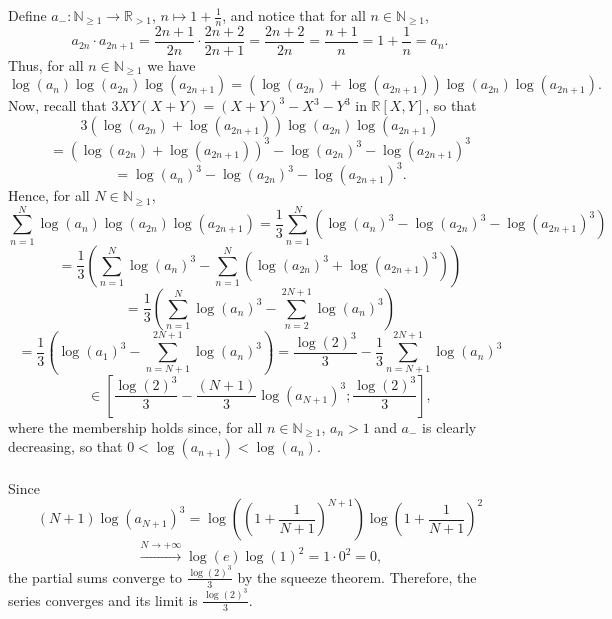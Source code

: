 \begin{solution}
    Define \( a_{-} \colon \mathbb{N}_{\geq 1} \to \mathbb{R}_{>1} \), \( n \mapsto 1+\frac{1}{n} \), and notice that for all \( n \in \mathbb{N}_{\geq 1} \),
    \[
        a_{2n} \cdot a_{2n+1} = \frac{2n+1}{2n} \cdot \frac{2n+2}{2n+1} = \frac{2n+2}{2n} = \frac{n+1}{n} = 1+\frac{1}{n} = a_n.
    \]
    Thus, for all \( n \in \mathbb{N}_{\geq 1} \) we have
    \[
        \log\left(a_n\right)\log\left(a_{2n}\right)\log\left(a_{2n+1}\right) = \left(\log\left(a_{2n}\right)+\log\left(a_{2n+1}\right)\right)\log\left(a_{2n}\right)\log\left(a_{2n+1}\right).
    \]
    Now, recall that \( 3XY\left(X+Y\right) = \left(X+Y\right)^3-X^3-Y^3 \) in \( \mathbb{R}\left[X,Y\right] \), so that
    \[
        3\left(\log\left(a_{2n}\right)+\log\left(a_{2n+1}\right)\right)\log\left(a_{2n}\right)\log\left(a_{2n+1}\right)
    \]
    \[
        = \left(\log\left(a_{2n}\right)+\log\left(a_{2n+1}\right)\right)^3-\log\left(a_{2n}\right)^3-\log\left(a_{2n+1}\right)^3
    \]
    \[
        = \log\left(a_n\right)^3-\log\left(a_{2n}\right)^3-\log\left(a_{2n+1}\right)^3.
    \]
    Hence, for all \( N \in \mathbb{N}_{\geq 1} \),
    \[
        \sum_{n=1}^{N} \log\left(a_n\right)\log\left(a_{2n}\right)\log\left(a_{2n+1}\right) = \frac{1}{3}\sum_{n=1}^{N} \left(\log\left(a_n\right)^3-\log\left(a_{2n}\right)^3-\log\left(a_{2n+1}\right)^3\right)
    \]
    \[
        = \frac{1}{3}\left(\sum_{n=1}^{N} \log\left(a_n\right)^3-\sum_{n=1}^{N} \left(\log\left(a_{2n}\right)^3+\log\left(a_{2n+1}\right)^3\right)\right)
    \]
    \[
        = \frac{1}{3}\left(\sum_{n=1}^{N} \log\left(a_n\right)^3-\sum_{n=2}^{2N+1} \log\left(a_n\right)^3\right)
    \]
    \[
        = \frac{1}{3}\left(\log\left(a_1\right)^3-\sum_{n=N+1}^{2N+1} \log\left(a_n\right)^3\right) = \frac{\log\left(2\right)^3}{3}-\frac{1}{3}\sum_{n=N+1}^{2N+1} \log\left(a_n\right)^3
    \]
    \[
        \in \left[\frac{\log\left(2\right)^3}{3}-\frac{\left(N+1\right)}{3}\log\left(a_{N+1}\right)^3 ; \frac{\log\left(2\right)^3}{3}\right],
    \]
    where the membership holds since, for all \( n \in \mathbb{N}_{\geq 1} \), \( a_n > 1 \) and \( a_{-} \) is clearly decreasing, so that \( 0<\log\left(a_{n+1}\right)<\log\left(a_n\right) \).
    \\\\
    Since
    \[
        \left(N+1\right)\log\left(a_{N+1}\right)^3 = \log\left(\left(1+\frac{1}{N+1}\right)^{N+1}\right)\log\left(1+\frac{1}{N+1}\right)^2
    \]
    \[
        \overset{N \to +\infty}{\longrightarrow} \log\left(e\right)\log\left(1\right)^2 = 1 \cdot 0^2 = 0,
    \]
    the partial sums converge to \( \frac{\log\left(2\right)^3}{3} \) by the squeeze theorem. Therefore, the series converges and its limit is \( \frac{\log\left(2\right)^3}{3} \).
\end{solution}

